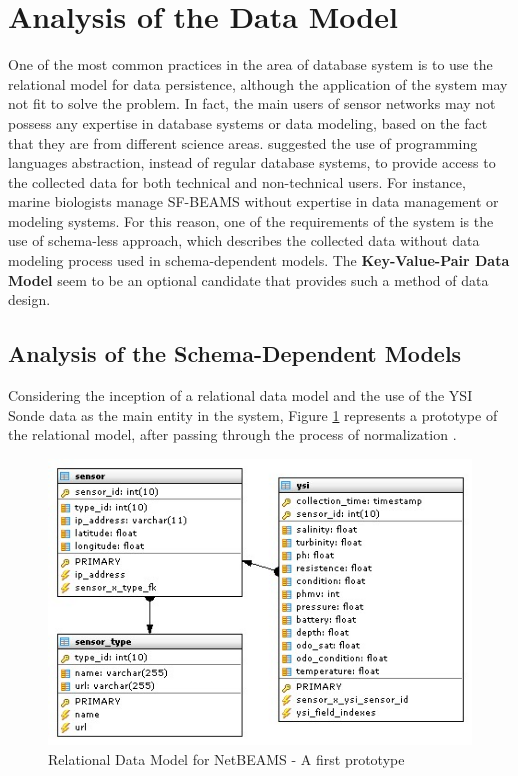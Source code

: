 \section{Analysis of the Data Model}

One of the most common practices in the area of database system is to use the
relational model for data persistence, although the application of the system
may not fit to solve the problem. In fact, the main users of sensor networks may
not possess any expertise in database systems or data modeling, based on the
fact that they are from different science areas. \cite{sn-programming-language}
suggested the use of programming languages abstraction, instead of regular
database systems, to provide access to the collected data for both
technical and non-technical users. For instance, marine biologists manage
SF-BEAMS without expertise in data management or modeling systems. For this
reason, one of the requirements of the system is the use of schema-less
approach, which describes the collected data without data modeling process
used in schema-dependent models. The \textbf{Key-Value-Pair Data Model} seem
to be an optional candidate that provides such a method of data design.

\subsection{Analysis of the Schema-Dependent Models}

Considering the inception of a relational data model \cite{relational-model}
and the use of the YSI Sonde data as the main entity in the system, Figure
\ref{fig:Relational-Model-Original} represents a prototype of the relational 
model, after passing through the process of normalization
\cite{db-normalization}.

\begin{figure}
  \centering
  \includegraphics[scale=0.5]{../diagrams/Relational-Model-Original}
  \caption{Relational Data Model for NetBEAMS - A first prototype}
  \label{fig:Relational-Model-Original}
\end{figure}

